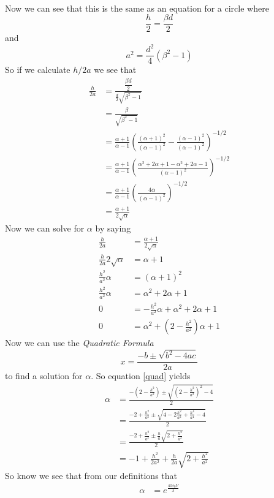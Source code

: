 \documentclass[11pt]{article}
\numberwithin{equation}{section}
\begin{document}
\begin{enumerate}[(a)]
\begin{align*}
\end{align*}
Now we can see that this is the same as an equation for a circle where
$$\frac{h}{2} = \frac{\beta d}{2}$$
and
$$a^2 = \frac{d^2}{4}\left(\beta^2-1\right)$$
So if we calculate $h/2a$ we see that
\begin{align*}
\frac{h}{2a} &= \frac{\dfrac{\beta d}{2}}{\frac{d}{2}\sqrt{\beta^2-1}}\\
&= \frac{\beta}{\sqrt{\beta^2-1}}\\
&= \frac{\alpha+1}{\alpha-1}\left(\frac{(\alpha+1)^2}{(\alpha-1)^2}-\frac{(\alpha-1)^2}{(\alpha-1)^2}\right)^{-1/2}\\
&= \frac{\alpha+1}{\alpha-1}\left(\frac{\alpha^2+2\alpha+1 - \alpha^2 + 2\alpha - 1}{(\alpha-1)^2}\right)^{-1/2}\\
&= \frac{\alpha+1}{\alpha-1}\left(\frac{4\alpha}{(\alpha-1)^2}\right)^{-1/2}\\
&= \frac{\alpha+1}{2\sqrt{\alpha}}
\end{align*}
Now we can solve for $\alpha$ by saying
\begin{align*}
\frac{h}{2a} &= \frac{\alpha+1}{2\sqrt{\alpha}}\\
\frac{h}{2a}2\sqrt{\alpha} &= {\alpha+1}\\
\frac{h^2}{a^2}\alpha &= (\alpha+1)^2\\
\frac{h^2}{a^2}\alpha &= \alpha^2+2\alpha+1\\
0 &= -\frac{h^2}{a^2}\alpha + \alpha^2+2\alpha+1\\
0 &=  \alpha^2+\left(2-\frac{h^2}{a^2}\right)\alpha+1
\end{align*}
Now we can use the \emph{Quadratic Formula} 
\begin{equation}
x = \frac{-b\pm\sqrt{b^2-4ac}}{2a}
\label{quad}
\end{equation}
to find a solution for $\alpha$. So equation \ref{quad} yields
\begin{align*}
\alpha &= \frac{-\left(2-\frac{h^2}{a^2}\right)\pm\sqrt{\left(2-\frac{h^2}{a^2}\right)^2 - 4}}{2}\\
&= \frac{-2+\frac{h^2}{a^2}\pm\sqrt{4-2\frac{h^2}{a^2}+\frac{h^4}{a^4} - 4}}{2}\\
&= \frac{-2+\frac{h^2}{a^2}\pm\frac{h}{a}\sqrt{2+\frac{h^2}{a^2}}}{2}\\
&= -1+\frac{h^2}{2a^2}+\frac{h}{2a}\sqrt{2+\frac{h^2}{a^2}}
\end{align*}
So know we see that from our definitions that
\begin{align*}
\alpha &= e^{\frac{4\pi\epsilon_0V}{\lambda}}\\ 

\end{align*}
\end{enumerate}
\end{document}
